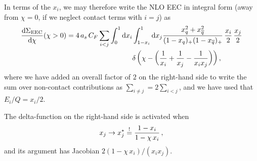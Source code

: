 In terms of the \(x_i\), we may therefore write the NLO EEC in integral form (away from \(\chi = 0\), if we neglect contact terms with \(i=j\)) as
\begin{align}
    \label{eq:ee2hadrons_EEC}
    \frac{\dd\Sigma_\text{EEC}}{\dd\chi}
    (\chi>0)
    =
    4\,
    \ascf
    \sum_{i<j}
    \int_0^1 \dd x_i
    &
    \int_{1-x_i}^1 \dd x_j
    \frac{x_q^2 + x_{\overline{q}}^2}{(1-x_q)_+(1-x_{\overline{q}})_+}
    \,\frac{x_i}{2}
    \,\frac{x_j}{2}
    \\
    &
    \notag
    \delta\le(
        \chi
        -
        \le(
            \frac{1}{x_i} + \frac{1}{x_j} - \frac{1}{x_i x_j}
        \ri)
    \ri)
    ,
\end{align}
where we have added an overall factor of \(2\) on the right-hand side to write the sum over non-contact contributions as \(\sum_{i \neq j} = 2 \sum_{i < j}\), and we have used that \(E_i/Q = x_i / 2\).

The delta-function on the right-hand side is activated when
\begin{align}
    x_j \to x_j^* \overset{!}{=} \frac{1-x_i}{1-\chi\,x_i}
    \,,
\end{align}
and its argument has Jacobian \(2(1 - \chi\,x_i)/(x_i x_j)\).

